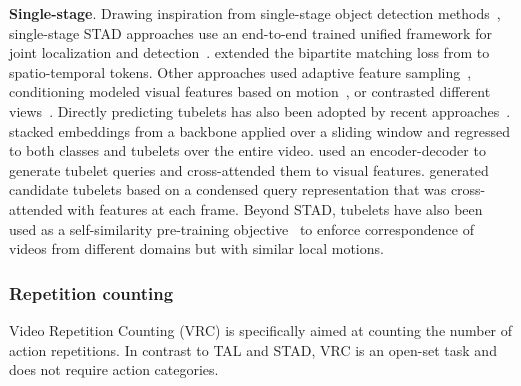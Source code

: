 \noindent
\textbf{Single-stage}. Drawing inspiration from single-stage object detection methods~\citep{carion2020end,redmon2016you,liu2016ssd}, single-stage STAD approaches use an end-to-end trained unified framework for joint localization and detection~\citep{chen2021watch,girdhar2019video,zhu2024dual}. \citet{ntinou2024multiscale} extended the bipartite matching loss from \citet{carion2020end} to spatio-temporal tokens. Other approaches used adaptive feature sampling~\citep{wu2023stmixer}, conditioning modeled visual features based on motion~\citep{zhao2019dance}, or contrasted different views~\citep{kumar2022end}. Directly predicting tubelets has also been adopted by recent approaches~\citep{gritsenko2024end,kalogeiton2017action,song2019tacnet,yang2019step,zhao2022tuber}. \citet{kalogeiton2017action} stacked embeddings from a backbone applied over a sliding window and regressed to both classes and tubelets over the entire video. \citet{zhao2022tuber} used an encoder-decoder to generate tubelet queries and cross-attended them to visual features. \citet{gritsenko2024end} generated candidate tubelets based on a condensed query representation that was cross-attended with features at each frame. Beyond STAD, tubelets have also been used as a self-similarity pre-training objective~\citep{thoker2023tubelet} to enforce correspondence of videos from different domains but with similar local motions. 

\subsubsection{Repetition counting}

Video Repetition Counting (VRC) is specifically aimed at counting the number of action repetitions. In contrast to TAL and STAD, VRC is an open-set task and does not require action categories.



